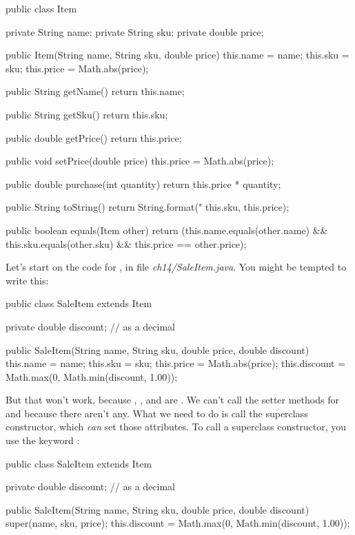 \begin{code}
public class Item {
    private String name;
    private String sku;
    private double price;
    
    public Item(String name, String sku, double price)  {
        this.name = name;
        this.sku = sku;
        this.price = Math.abs(price);
    }
    
    public String getName() {
        return this.name;
    }
    
    public String getSku() {
        return this.sku;
    }
    
    public double getPrice() {
        return this.price;
    }
    
    public void setPrice(double price) {
        this.price = Math.abs(price);
    }
    
    public double purchase(int quantity) {
        return this.price * quantity;
    }
    
    public String toString() {
        return String.format("%
            this.sku, this.price);
    }
    
    public boolean equals(Item other) {
        return (this.name.equals(other.name) &&
            this.sku.equals(other.sku) &&
            this.price == other.price);
    }
}
\end{code}

Let's start on the code for , in file {\em ch14/SaleItem.java}. You might be tempted to write this:

\begin{code}
public class SaleItem extends Item {
    private double discount; // as a decimal
   
    public SaleItem(String name, String sku, double price,
       double discount)  {
       this.name = name;
       this.sku = sku;
       this.price = Math.abs(price);
       this.discount = Math.max(0,
           Math.min(discount, 1.00));
    }
}
\end{code}

But that won't work, because , , and  are .  We can't call the setter methods for  and  because there aren't any. What we need to do is call the superclass constructor, which {\em can} set those attributes.  To call a superclass constructor, you use the keyword :

\begin{code}
public class SaleItem extends Item {
    private double discount; // as a decimal
   
    public SaleItem(String name, String sku, double price,
       double discount)  {
       super(name, sku, price);
       this.discount = Math.max(0,
           Math.min(discount, 1.00));
    }
}
\end{code}

